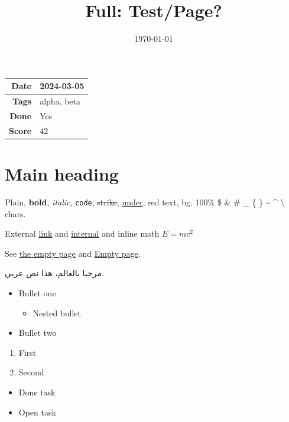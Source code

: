 \documentclass[11pt,a4paper]{article}
\title{Full: Test/Page?}
\author{}
\date{\today}
\begin{document}
\maketitle

\begin{center}
\begin{tabular}{|r|l|}
  \hline
  \textbf{Date} & 2024-03-05 \\
  \hline
  \textbf{Tags} & alpha, beta \\
  \hline
  \textbf{Done} & Yes \\
  \hline
  \textbf{Score} & 42 \\
  \hline
\end{tabular}
\end{center}
\medskip



\section*{Main heading}
Plain, \textbf{bold}, \textit{italic}, \texttt{code}, \sout{strike}, \underline{under}, red text, bg. 100\% \$ \& \# \_ \{ \} \textasciitilde{} \textasciicircum{} \textbackslash{} chars.\par\medskip
External \href{https://example.com/a?b=1\#c}{link} and \href{/aabbccddeeff00112233445566778899}{internal} and inline math $E=mc^2$\par\medskip
See \href{/bbbbbbbbbbbbbbbbbbbbbbbbbbbbbbbb}{the empty page} and \href{https://www.notion.so/bbbbbbbbbbbbbbbbbbbbbbbbbbbbbbbb}{Empty page}.\par\medskip
مرحبا بالعالم، هذا نص عربي.\par\medskip
\begin{itemize}
  \item Bullet one
\begin{itemize}
  \item Nested bullet
\end{itemize}
  \item Bullet two
\end{itemize}
\begin{enumerate}
  \item First
  \item Second
\end{enumerate}
\begin{itemize}
  \item[$\boxtimes$] Done task
  \item[$\square$] Open task
\end{itemize}
\end{document}
